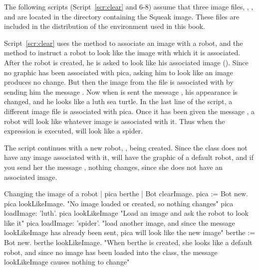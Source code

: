 \documentclass[a4paper,10pt,twoside]{book}
\begin{document}
The following scripts (Script~\ref{scr:clear} and 6-8) assume that three image files, , 
, and  are located in the directory containing the Squeak image. 
These files are included in the distribution of the environment used in this book. 

Script~\ref{scr:clear} uses the method  to associate an image with a robot, and the method 
 to instruct a robot to look like the image with which it is associated. After the robot 
 is created, he is asked to look like his associated image (). Since no 
graphic has been associated with pica, asking him to look like an image produces no change. 
But then the image from the file  is associated with  by sending him the message 
. Now when  is sent the message , his appearance is 
changed, and he looks like a luth sea turtle. In the last line of the script, a different image file is 
associated with pica. Once it has been given the message , a robot will look like 
whatever image is associated with it. Thus when the expression  is 
executed,  will look like a spider. 

The script continues with a new robot, , being created. Since the class  does not 
have any image associated with it,  will have the graphic of a default robot, and if you 
send her the message , nothing changes, since she does not have an associated 
image. 


\begin{script}[clear]{Changing the image of a robot}
	| pica berthe | 
	Bot clearImage. 
	pica := Bot new. 
	pica lookLikeImage. 
	"No image loaded or created, so nothing changes" 
	pica loadImage: 'luth'. 
	pica lookLikeImage 
	"Load an image and ask the robot to look like it" 
	pica loadImage: 'spider'. 
	"load another image, and since the message lookLikeImage has already been 
	sent, pica will look like the new image" 
	berthe := Bot new. 
	berthe lookLikeImage. 
	"When berthe is created, she looks like a default robot, and since no image 
	has been loaded into the class, the message lookLikeImage causes nothing to 
	change"
\end{script}
\end{document}
